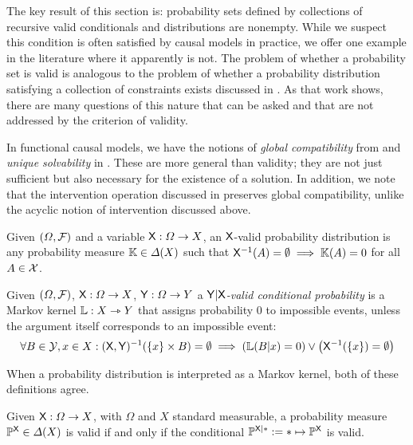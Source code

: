 The key result of this section is: probability sets defined by collections of recursive valid conditionals and distributions are nonempty. While we suspect this condition is often satisfied by causal models in practice, we offer one example in the literature where it apparently is not. The problem of whether a probability set is valid is analogous to the problem of whether a probability distribution satisfying a collection of constraints exists discussed in \citet{vorobev_consistent_1962}. As that work shows, there are many questions of this nature that can be asked and that are not addressed by the criterion of validity.

In functional causal models, we have the notions of \emph{global compatibility} from \citet{forre_causal_2020} and \emph{unique solvability} in \citet{bongers_theoretical_2016}. These are more general than validity; they are not just sufficient but also necessary for the existence of a solution. In addition, we note that the intervention operation discussed in \citet{forre_causal_2020} preserves global compatibility, unlike the acyclic notion of intervention discussed above.

\begin{definition}\label{def:valid_dist}
Given $(\Omega,\mathcal{F})$ and a variable $\mathsf{X}:\Omega\to X$, an $\mathsf{X}$-valid probability distribution is any probability measure $\mathbb{K}\in \Delta(X)$ such that $\mathsf{X}^{-1}(A)=\emptyset\implies \mathbb{K}(A) = 0$ for all $A\in\mathcal{X}$.
\end{definition}

\begin{definition}\label{def:valid_conditional_prob}
Given $(\Omega,\mathcal{F})$, $\mathsf{X}:\Omega\to X$, $\mathsf{Y}:\Omega\to Y$ a \emph{$\mathsf{Y}|\mathsf{X}$-valid conditional probability} is a Markov kernel $\mathbb{L}:X\rightarrowtriangle Y$ that assigns probability 0 to impossible events, unless the argument itself corresponds to an impossible event:
\begin{align}
    \forall B\in \mathcal{Y}, x\in X: (\mathsf{X},\mathsf{Y})^{-1} (\{x\}\times B) = \emptyset \implies \left(\mathbb{L}(B|x) = 0\right) \lor \left(\mathsf{X}^{-1} (\{x\}) = \emptyset\right)
\end{align}
\end{definition}

When a probability distribution is interpreted as a Markov kernel, both of these definitions agree.

\begin{theorem}\label{th:valid_agree}
Given $\mathsf{X}:\Omega\to X$, with $\Omega$ and $X$ standard measurable, a probability measure $\mathbb{P}^{\mathsf{X}}\in \Delta(X)$ is valid if and only if the conditional $\mathbb{P}^{\mathsf{X}|*}:=*\mapsto \mathbb{P}^{\mathsf{X}}$ is valid.
\end{theorem}

